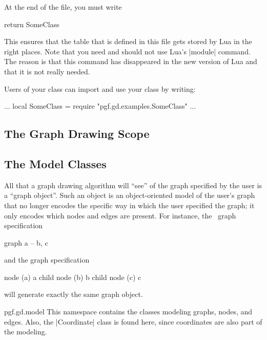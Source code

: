 At the end of the file, you must write
%
\begin{codeexample}[code only, tikz syntax=false]
return SomeClass
\end{codeexample}
%
This ensures that the table that is defined in this file gets stored by Lua in
the right places. Note that you need and should not use Lua's |module| command.
The reason is that this command has disappeared in the new version of Lua and
that it is not really needed.

Users of your class can import and use your class by writing:
%
\begin{codeexample}[code only, tikz syntax=false]
...
local SomeClass = require "pgf.gd.examples.SomeClass"
...
\end{codeexample}


\subsection{The Graph Drawing Scope}
\label{section-gd-gd-scope}



\subsection{The Model Classes}
\label{section-gd-models}

All that a graph drawing algorithm will ``see'' of the graph specified by the
user is a ``graph object''. Such an object is an object-oriented model of the
user's graph that no longer encodes the specific way in which the user
specified the graph; it only encodes which nodes and edges are present. For
instance, the \tikzname\ graph specification
%
\begin{codeexample}
graph { a -- {b, c} }
\end{codeexample}
%
\noindent and the graph specification
%
\begin{codeexample}
node (a) { a }
child { node (b) {b} }
child { node (c) {c} }
\end{codeexample}
%
will generate exactly the same graph object.

\begin{luanamespace}{pgf.gd.}{model}
    This namespace contains the classes modeling graphs, nodes, and edges.
    Also, the |Coordinate| class is found here, since coordinates are also part
    of the modeling.
\end{luanamespace}


